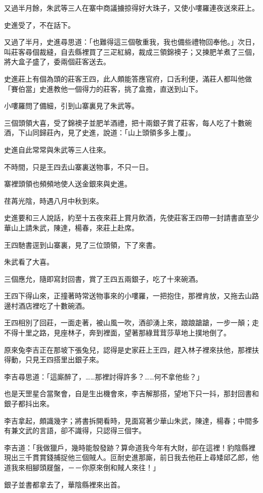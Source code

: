 \documentclass[11pt,a4paper]{article}
\begin{document}
又過半月餘，朱武等三人在寨中商議擄掠得好大珠子，又使小嘍羅連夜送來莊上。

史進受了，不在話下。

又過了半月，史進尋思道：「也難得這三個敬重我，我也備些禮物回奉他。」次日，叫莊客尋個裁縫，自去縣裡買了三疋紅綿，裁成三領錦襖子；又揀肥羊煮了三個，將大盒子盛了，委兩個莊客送去。

史進莊上有個為頭的莊客王四，此人頗能答應官府，口舌利便，滿莊人都叫他做「賽伯當」史進教他一個得力的莊客，挑了盒擔，直送到山下。

小嘍羅問了備細，引到山寨裏見了朱武等。

三個頭領大喜，受了錦襖子並肥羊酒禮，把十兩銀子賞了莊客，每人吃了十數碗酒，下山同歸莊內，見了史進，說道：「山上頭領多多上覆」。

史進自此常常與朱武等三人往來。

不時間，只是王四去山寨裏送物事，不只一日。

寨裡頭領也頻頻地使人送金銀來與史進。

荏苒光陰，時遇八月中秋到來。

史進要和三人說話，約至十五夜來莊上賞月飲酒，先使莊客王四帶一封請書直至少華山上請朱武，陳達，楊春，來莊上赴席。

王四馳書逕到山寨裏，見了三位頭領，下了來書。

朱武看了大喜。

三個應允，隨即寫封回書，賞了王四五兩銀子，吃了十來碗酒。

王四下得山來，正撞著時常送物事來的小嘍羅，一把抱住，那裡肯放，又拖去山路邊村酒店裡吃了十數碗酒。

王四相別了回莊，一面走著，被山風一吹，酒卻湧上來，踉踉蹌蹌，一步一顛；走不得十里之路，見座林子，奔到裡面，望著那綠茸茸莎草地上撲地倒了。

原來兔李吉正在那坡下張兔兒，認得是史家莊上王四，趕入林子裡來扶他，那裡扶得動，只見王四搭里出銀子來。

李吉尋思道：「這廝醉了，……那裡討得許多？……何不拿他些？」

也是天罡星合當聚會，自是生出機會來，李吉解那搭，望地下只一抖，那封回書和銀子都抖出來。

李吉拿起，頗識幾字；將書拆開看時，見面寫著少華山朱武，陳達，楊春；中間多有兼文武的言語，卻不識得，只認得三個字。

李吉道：「我做獵戶，幾時能彀發跡？算命道我今年有大財，卻在這裡！豹陰縣裡現出三千貫賞錢捕捉他三個賊人。叵耐史進那廝，前日我去他莊上尋矮邱乙郎，他道我來相腳頭屣盤，－－你原來倒和賊人來往！」

銀子並書都拿去了，華陰縣裡來出首。
\end{document}
